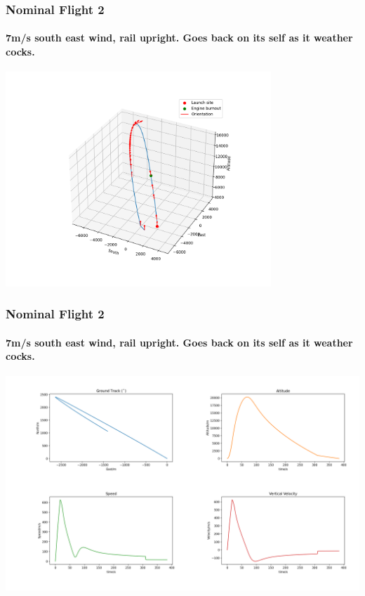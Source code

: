 \documentclass{beamer}
\begin{document}
    \begin{frame}
        \frametitle{Nominal Flight 2}
        \framesubtitle{7m/s south east wind, rail upright. Goes back on its self as it weather cocks.}
        \begin{center}
            \includegraphics[width=0.75\textwidth]{images/example2.png}
        \end{center}
    \end{frame}
    \begin{frame}
        \frametitle{Nominal Flight 2}
        \framesubtitle{7m/s south east wind, rail upright. Goes back on its self as it weather cocks.}
        \begin{center}
            \includegraphics[width=\textwidth]{images/example2a.png}
        \end{center}
    \end{frame}
\end{document}
